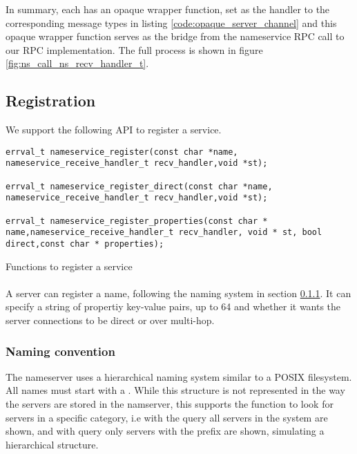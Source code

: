 In summary, each has an opaque wrapper function, set as the handler to the corresponding message types in listing \ref{code:opaque_server_channel} and this opaque wrapper function serves as the bridge from the nameservice RPC call to our RPC implementation. The full process is shown in figure \ref{fig:ns_call_ns_recv_handler_t}.

\subsection{Registration}

We support the following API to register a service.


\begin{code}
\begin{mdframed}[style=myframe]
\begin{verbatim}
errval_t nameservice_register(const char *name, nameservice_receive_handler_t recv_handler,void *st);

errval_t nameservice_register_direct(const char *name, nameservice_receive_handler_t recv_handler,void *st);

errval_t nameservice_register_properties(const char * name,nameservice_receive_handler_t recv_handler, void * st, bool direct,const char * properties);
\end{verbatim}
\end{mdframed}


\caption{Functions to register a service}
\newline
\label{code:server_register}
\end{code}

\paragraph{}
A server can register a name, following the naming system in section  \ref{naming_system}. It can specify a string of propertiy key-value pairs, up to 64 and whether it wants the server connections to be direct or over multi-hop.

\subsubsection{Naming convention} \label{naming_system}

The nameserver uses a hierarchical naming system similar to a POSIX filesystem. All names must start with a \C{/}. While this structure is not represented in the way the servers are stored in the namserver, this supports the  function to look for servers in a specific category, i.e with the query \C{/} all servers in the system are shown, and with query  only servers with the prefix  are shown, simulating a hierarchical structure.  
